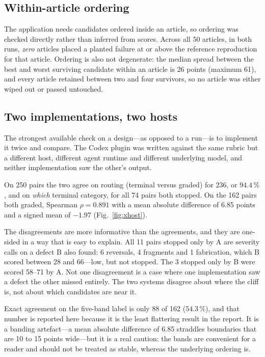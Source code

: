 \documentclass[conference]{IEEEtran}
\begin{document}
\subsection{Within-article ordering}
The application needs candidates ordered inside an article, so ordering
was checked directly rather than inferred from scores. Across all 50
articles, in both runs, \emph{zero} articles placed a planted failure at
or above the reference reproduction for that article. Ordering is also
not degenerate: the median spread between the best and worst surviving
candidate within an article is 26 points (maximum 61), and every article
retained between two and four survivors, so no article was either wiped
out or passed untouched.

\subsection{Two implementations, two hosts}
The strongest available check on a design---as opposed to a run---is to
implement it twice and compare. The Codex plugin was written against the
same rubric but a different host, different agent runtime and different
underlying model, and neither implementation saw the other's output.

On 250 pairs the two agree on routing (terminal versus graded) for 236,
or $94.4\,\%$, and on \emph{which} terminal category, for all 74 pairs
both stopped. On the 162 pairs both graded, Spearman
$\rho = 0.891$ with a mean absolute difference of 6.85 points and a
signed mean of $-1.97$ (Fig.~\ref{fig:xhost}).

The disagreements are more informative than the agreements, and they are
one-sided in a way that is easy to explain. All 11 pairs stopped only by
A are severity calls on a defect B also found: 6 reversals, 4 fragments
and 1 fabrication, which B scored between 28 and 66---low, but not
stopped. The 3 stopped only by B were scored 58--71 by A. Not one
disagreement is a case where one implementation saw a defect the other
missed entirely. The two systems disagree about where the cliff is, not
about which candidates are near it.

Exact agreement on the five-band label is only 88 of 162 ($54.3\,\%$),
and that number is reported here because it is the least flattering
result in the report. It is a banding artefact---a mean absolute
difference of 6.85 straddles boundaries that are 10 to 15 points
wide---but it is a real caution: the bands are convenient for a reader
and should not be treated as stable, whereas the underlying ordering is.
\end{document}
